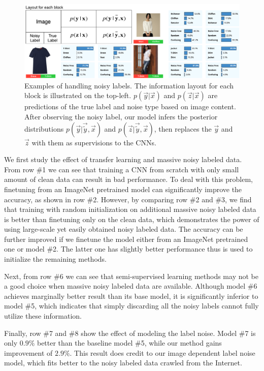 \begin{figure}
\begin{center}
\includegraphics[width=1.0\linewidth]{figures/noisy_labels/model_output.pdf}
\caption{Examples of handling noisy labels. The information layout for each block is illustrated on the top-left. $p(\vec{y}|\vec{x})$ and $p(\vec{z}|\vec{x})$ are predictions of the true label and noise type based on image content. After observing the noisy label, our model infers the posterior distributions $p(\vec{y}|\vec{\tilde{y}},\vec{x})$ and $p(\vec{z}|\vec{\tilde{y}},\vec{x})$, then replaces the $\vec{y}$ and $\vec{z}$ with them as supervisions to the CNNs.}
\label{fig:nl-model-output}
\end{center}
\end{figure}

We first study the effect of transfer learning and massive noisy labeled data. From row \#1 we can see that training a CNN from scratch with only small amount of clean data can result in bad performance. To deal with this problem, finetuning from an ImageNet pretrained model can significantly improve the accuracy, as shown in row \#2. However, by comparing row \#2 and \#3, we find that training with random initialization on additional massive noisy labeled data is better than finetuning only on the clean data, which demonstrates the power of using large-scale yet easily obtained noisy labeled data. The accuracy can be further improved if we finetune the model either from an ImageNet pretrained one or model \#2. The latter one has slightly better performance thus is used to initialize the remaining methods.

Next, from row \#6 we can see that semi-supervised learning methods may not be a good choice when massive noisy labeled data are available. Although model \#6 achieves marginally better result than its base model, it is significantly inferior to model \#5, which indicates that simply discarding all the noisy labels cannot fully utilize these information.

Finally, row \#7 and \#8 show the effect of modeling the label noise. Model \#7 is only $0.9\%$ better than the baseline model \#5, while our method gains improvement of $2.9\%$. This result does credit to our image dependent label noise model, which fits better to the noisy labeled data crawled from the Internet.

